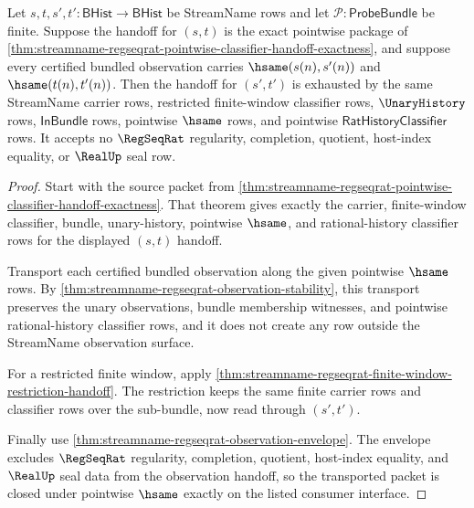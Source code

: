 \begin{theorem}
\label{thm:streamname-regseqrat-pointwise-hsame-closure}
Let $s,t,s',t':\mathsf{BHist}\to\mathsf{BHist}$ be StreamName rows and let
$\mathcal P:\mathsf{ProbeBundle}$ be finite. Suppose the handoff for
$(s,t)$ is the exact pointwise package of
\autoref{thm:streamname-regseqrat-pointwise-classifier-handoff-exactness},
and suppose every certified bundled observation carries
$\hsame(s(n),s'(n))$ and $\hsame(t(n),t'(n))$. Then the handoff for
$(s',t')$ is exhausted by the same StreamName carrier rows, restricted
finite-window classifier rows, $\UnaryHistory$ rows, $\mathsf{InBundle}$ rows,
pointwise $\hsame$ rows, and pointwise $\mathsf{RatHistoryClassifier}$ rows.
It accepts no $\RegSeqRat$ regularity, completion, quotient, host-index
equality, or $\RealUp$ seal row.
\end{theorem}
\begin{proof}
Start with the source packet from
\autoref{thm:streamname-regseqrat-pointwise-classifier-handoff-exactness}.
That theorem gives exactly the carrier, finite-window classifier, bundle,
unary-history, pointwise $\hsame$, and rational-history classifier rows for
the displayed $(s,t)$ handoff.

Transport each certified bundled observation along the given pointwise
$\hsame$ rows. By
\autoref{thm:streamname-regseqrat-observation-stability}, this transport
preserves the unary observations, bundle membership witnesses, and pointwise
rational-history classifier rows, and it does not create any row outside the
StreamName observation surface.

For a restricted finite window, apply
\autoref{thm:streamname-regseqrat-finite-window-restriction-handoff}. The
restriction keeps the same finite carrier rows and classifier rows over the
sub-bundle, now read through $(s',t')$.

Finally use \autoref{thm:streamname-regseqrat-observation-envelope}. The
envelope excludes $\RegSeqRat$ regularity, completion, quotient, host-index
equality, and $\RealUp$ seal data from the observation handoff, so the
transported packet is closed under pointwise $\hsame$ exactly on the listed
consumer interface.
\end{proof}


